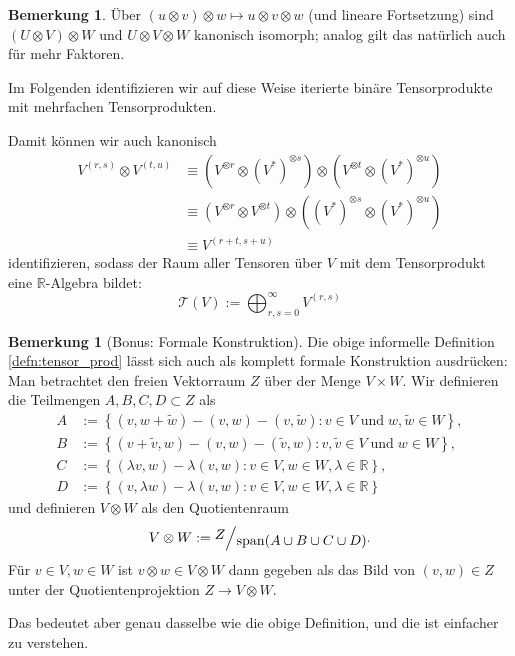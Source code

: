 \documentclass[a4paper]{scrreprt}
\numberwithin{equation}{chapter}
\newcommand{\R}{\mathbb{R}}
\theoremstyle{definition}
\newtheorem{bem}[defn]{Bemerkung}
\begin{document}
\begin{bem}
	Über $(u\otimes v)\otimes w \mapsto u\otimes v\otimes w$ (und lineare Fortsetzung) sind $(U\otimes V)\otimes W$ und $U\otimes V\otimes W$ kanonisch isomorph; analog gilt das natürlich auch für mehr Faktoren.

	Im Folgenden identifizieren wir auf diese Weise iterierte binäre Tensorprodukte mit mehrfachen Tensorprodukten.

	Damit können wir auch kanonisch
	\begin{align*}
		V^{(r,s)} \otimes V^{(t,u)} &\equiv (V^{\otimes r} \otimes (V^*)^{\otimes s}) \otimes (V^{\otimes t} \otimes (V^*)^{\otimes u})\\
		&\equiv (V^{\otimes r} \otimes V^{\otimes t}) \otimes ((V^*)^{\otimes s} \otimes (V^*)^{\otimes u})\\
		&\equiv V^{(r+t, s+u)}
	\end{align*}
	identifizieren, sodass der Raum aller Tensoren über $V$ mit dem Tensorprodukt eine $\R$-Algebra bildet:
	\[\mathcal{T}(V) := \bigoplus_{r,s=0}^{\infty} V^{(r,s)}\]
\end{bem}

\begin{bem}[Bonus: Formale Konstruktion]
	Die obige informelle Definition \ref{defn:tensor_prod} lässt sich auch als komplett formale Konstruktion ausdrücken: Man betrachtet den freien Vektorraum $Z$ über der Menge $V\times W$. Wir definieren die Teilmengen $A,B,C,D \subset Z$ als
	\begin{align*}
		A &:= \left\{(v,w+\tilde w) - (v,w) - (v,\tilde w): v\in V \; \text{und} \; w, \tilde w \in W\right\},\\
		B &:= \left\{(v+\tilde v,w) - (v,w) - (\tilde v,w): v,\tilde v\in V \; \text{und} \; w\in W\right\},\\
		C &:= \left\{(\lambda v,w) - \lambda(v,w): v\in V, w \in W, \lambda\in\R\right\},\\
		D &:= \left\{(v,\lambda w) - \lambda(v,w): v\in V, w \in W, \lambda\in\R\right\}
	\end{align*}
	und definieren $V\otimes W$ als den Quotientenraum
	\[V\otimes W := \raise0.5ex\hbox{$Z$} \Big/ \lower0.5ex\hbox{$\mathrm{span}(A\cup B\cup C\cup D)$}.\]
	Für $v\in V, w\in W$ ist $v\otimes w \in V\otimes W$ dann gegeben als das Bild von $(v,w) \in Z$ unter der Quotientenprojektion $Z\to V\otimes W$.

	Das bedeutet aber genau dasselbe wie die obige Definition, und die ist einfacher zu verstehen.
\end{bem}
\end{document}
